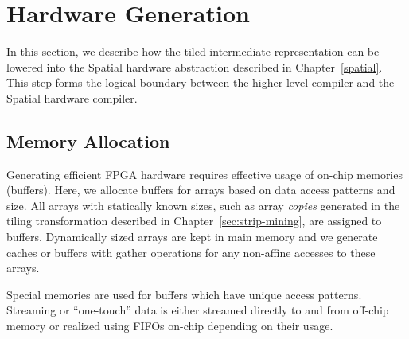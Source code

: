 \section{Hardware Generation}
\label{hardware}

In this section, we describe how the tiled intermediate representation can be
lowered into the Spatial hardware abstraction described in Chapter~\ref{spatial}.
This step forms the logical boundary between the higher level compiler and the Spatial hardware compiler.

\subsection{Memory Allocation}
Generating efficient FPGA hardware requires effective usage of on-chip memories (buffers).
Here, we allocate buffers for arrays based on data access patterns and size.
All arrays with statically known sizes, such as array \emph{copies} generated in the tiling transformation described in
Chapter~\ref{sec:strip-mining}, are assigned to buffers.
Dynamically sized arrays are kept in main memory and we generate
caches or buffers with gather operations for any non-affine accesses to these arrays.

Special memories are used for buffers which have unique access patterns.
Streaming or ``one-touch'' data is  either streamed directly to and from off-chip memory
or realized using FIFOs on-chip depending on their usage.

